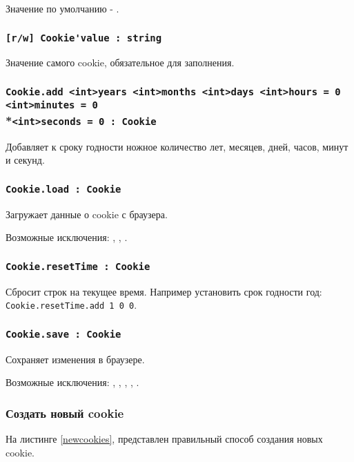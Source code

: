 Значение по умолчанию - \false.

\subsubsection{\lstinline|[r/w] Cookie'value : string|}

Значение самого cookie, обязательное для заполнения.

\subsubsection{\lstinline|Cookie.add <int>years <int>months <int>days <int>hours = 0 <int>minutes = 0|\\*\noindent\lstinline|<int>seconds = 0 : Cookie|}

Добавляет к сроку годности ножное количество лет, месяцев, дней, часов, минут и секунд.

\subsubsection{\lstinline|Cookie.load : Cookie|}

Загружает данные о cookie с браузера.

Возможные исключения: , , .

\subsubsection{\lstinline|Cookie.resetTime : Cookie|}

Сбросит строк на текущее время. Например установить срок годности год: \lstinline|Cookie.resetTime.add 1 0 0|.

\subsubsection{\lstinline|Cookie.save : Cookie|}

Сохраняет изменения в браузере.

Возможные исключения: , , , , .

\subsubsection{Создать новый cookie}

На листинге \ref{newcookies}, представлен правильный способ создания новых cookie.

